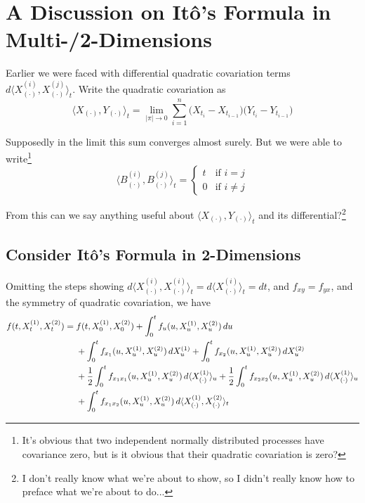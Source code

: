 \documentclass[12pt]{article}
\newlength\tindent
\renewcommand{\indent}{\hspace*{\tindent}}
\begin{document}
\section{A Discussion on It\^{o}'s Formula in Multi-/2-Dimensions}

\indent Earlier we were faced with differential quadratic covariation terms $d\langle X^{(i)}_{(\cdot)},X^{(j)}_{(\cdot)}\rangle_t$. Write the quadratic covariation as
\begin{equation*}
	\langle X_{(\cdot)},Y_{(\cdot)}\rangle_t = \lim_{|\pi|\to0} \sum^n_{i=1}\big(X_{t_i} - X_{t_{i-1}}\big)\big(Y_{t_i} - Y_{t_{i-1}}\big)
\end{equation*}

Supposedly in the limit this sum converges almost surely. But we were able to write\footnote{It's obvious that two independent normally distributed processes have covariance zero, but is it obvious that their quadratic covariation is zero?}
\begin{equation*}
	\langle B^{(i)}_{(\cdot)},B^{(j)}_{(\cdot)}\rangle_t = 
	\begin{cases}
	t & \text{if } i = j \\
	0 & \text{if } i \neq j
	\end{cases}
\end{equation*}

From this can we say anything useful about $\langle X_{(\cdot)},Y_{(\cdot)}\rangle_t$ and its differential?\footnote{I don't really know what we're about to show, so I didn't really know how to preface what we're about to do...}

\subsection{Consider It\^{o}'s Formula in 2-Dimensions}

\indent Omitting the steps showing $d\langle X^{(i)}_{(\cdot)},X^{(i)}_{(\cdot)}\rangle_t = d\langle X^{(i)}_{(\cdot)}\rangle_t = dt$, and $f_{xy}=f_{yx}$, and the symmetry of quadratic covariation, we have
\begin{align*}
	f(t,X^{(1)}_t,X^{(2)}_t) &= f(t,X^{(1)}_0,X^{(2)}_0) + \int^t_0 f_u(u,X^{(1)}_u,X^{(2)}_u)\,du \\
	&\hphantom{{}={}} + \int^t_0 f_{x_1}(u,X^{(1)}_u,X^{(2)}_u)\,dX^{(1)}_u + \int^t_0 f_{x_2}(u,X^{(1)}_u,X^{(2)}_u)\,dX^{(2)}_u \\
	&\hphantom{{}={}} + \frac{1}{2}\int^t_0 f_{x_1x_1}(u,X^{(1)}_u,X^{(2)}_u)\,d\langle X^{(1)}_{(\cdot)}\rangle_u + \frac{1}{2}\int^t_0 f_{x_2x_2}(u,X^{(1)}_u,X^{(2)}_u)\,d\langle X^{(1)}_{(\cdot)}\rangle_u \\
	&\hphantom{{}={}} + \int^t_0f_{x_1x_2}(u,X^{(1)}_u,X^{(2)}_u)\,d\langle X^{(1)}_{(\cdot)},X^{(2)}_{(\cdot)}\rangle_t
\end{align*}
\end{document}
